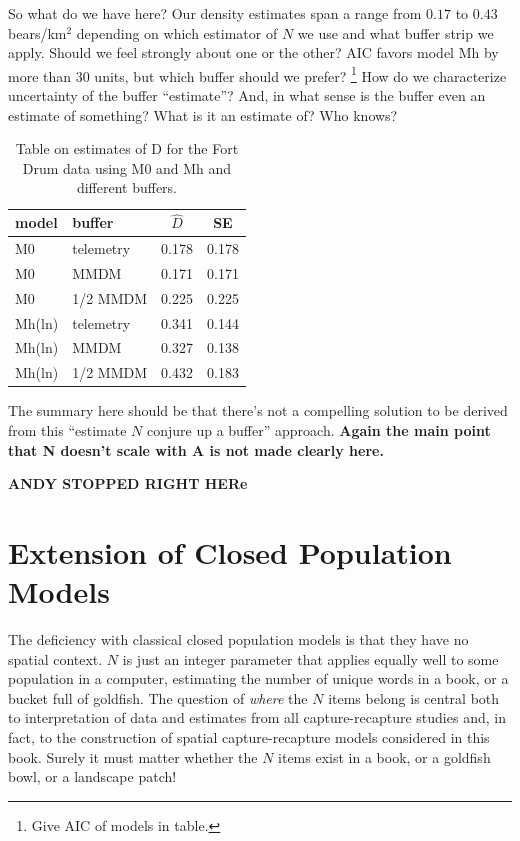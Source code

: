 So what do we have here?  Our density estimates span  a range
from $0.17$ to $0.43$ bears/km$^2$ depending on which estimator of $N$ we use and
what buffer strip we apply. Should we feel strongly about one or the other?
AIC favors model Mh by more than 30 units, but which buffer should we
prefer? \footnote{Give AIC of models in table.} 
How do we characterize uncertainty of the buffer ``estimate''?  And,
in what sense is the
buffer even an estimate of something? What is it an estimate of? Who
knows?  

\begin{table}[ht]
\centering
\caption{Table on estimates of D for the Fort Drum data
using M0 and Mh and different buffers.}
\begin{tabular}{ll|cc} 
\hline
model & buffer &  $\hat{D}$ & SE \\ \hline
M0   & telemetry &  0.178 & 0.178 \\
M0    & MMDM     &  0.171 & 0.171\\
M0   & 1/2 MMDM  &  0.225 & 0.225\\
Mh(ln) & telemetry &0.341 & 0.144\\
Mh(ln) & MMDM    &  0.327 & 0.138\\
Mh(ln) & 1/2 MMDM & 0.432 & 0.183\\
\end{tabular}
\label{tab.fdests}
\end{table}

The summary here should be that there's not a compelling solution to be derived from
this ``estimate $N$ conjure up a buffer'' approach. 
{\bf Again the main point that N doesn't scale with A is not made
  clearly here.}


{\bf ANDY STOPPED RIGHT HERe}

\section{Extension of Closed Population Models}

The deficiency with classical closed population models is that they
have no spatial context. $N$ is just an integer parameter that applies
equally well to some population in a computer, estimating the number
of unique words in a book, or a bucket full of goldfish.  The question
of {\it where} the $N$ items belong is central both to interpretation
of data and estimates from all capture-recapture studies and, in fact,
to the construction of spatial capture-recapture models considered in
this book.  Surely it must matter whether the $N$ items exist 
in a book, or a goldfish bowl, or a landscape patch!

